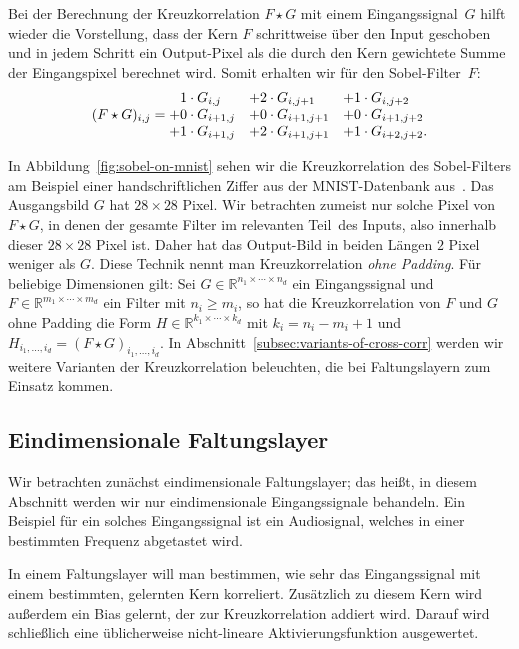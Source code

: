 \documentclass[paper=a4, 	%
		fontsize=11pt,
		abstract=true, 	%
		headsepline, 	%
		notitlepage	%
		]{scrartcl}
\theoremstyle{definition}
\newcommand{\R}{\mathbb{R}}
\begin{document}
Bei der Berechnung der Kreuzkorrelation $F\star G$ mit einem Eingangssignal~$G$ hilft wieder die Vorstellung, dass der Kern $F$ schrittweise über den Input geschoben und in jedem Schritt ein Output-Pixel als die durch den Kern gewichtete Summe der Eingangspixel berechnet wird.
Somit erhalten wir für den Sobel-Filter~$F$:
\[
(F\star G)_{i,j} = \begin{matrix*}[l]
    \hphantom{+}1\cdot G_{i,j}  & + 2\cdot G_{i, j+1} & + 1\cdot G_{i, j+2} \\
    + 0\cdot G_{i+1, j} &+ 0\cdot G_{i+1, j+1} &+ 0\cdot G_{i+1, j+2} \\
    +1\cdot G_{i+1, j} &+ 2\cdot G_{i+1, j+1} &+ 1\cdot G_{i+2, j+2}.
    \end{matrix*}
\]

In Abbildung~\ref{fig:sobel-on-mnist} sehen wir die Kreuzkorrelation des Sobel-Filters am Beispiel einer handschriftlichen Ziffer aus der MNIST-Datenbank aus~\cite{lecun2010mnist}.
Das Ausgangsbild $G$ hat $28\times 28$ Pixel.
Wir betrachten zumeist nur solche Pixel von $F\star G$, in denen der gesamte Filter im \glqq relevanten Teil\grqq\ des Inputs, also innerhalb dieser $28\times 28$ Pixel ist.
Daher hat das Output-Bild in beiden Längen $2$ Pixel weniger als $G$.
Diese Technik nennt man Kreuzkorrelation \emph{ohne Padding}.
Für beliebige Dimensionen gilt: Sei $G\in\R^{n_1\times\cdots \times n_d}$ ein Eingangssignal und $F\in\R^{m_1\times\cdots\times m_d}$ ein Filter mit $n_i \geq m_i$, so hat die Kreuzkorrelation von $F$ und $G$ ohne Padding die Form $H\in\R^{k_1\times\cdots\times k_d}$ mit $k_i = n_i - m_i + 1$ und $H_{i_1,\dots,i_d} = (F\star G)_{i_1,\dots,i_d}$. 
In Abschnitt~\ref{subsec:variants-of-cross-corr} werden wir weitere Varianten der Kreuzkorrelation beleuchten, die bei Faltungslayern zum Einsatz kommen.




\subsection{Eindimensionale Faltungslayer}

Wir betrachten zunächst eindimensionale Faltungslayer; das heißt, in diesem Abschnitt werden wir nur eindimensionale Eingangssignale behandeln.
Ein Beispiel für ein solches Eingangssignal ist ein Audiosignal, welches in einer bestimmten Frequenz abgetastet wird.

In einem Faltungslayer will man bestimmen, wie sehr das Eingangssignal mit einem bestimmten, gelernten Kern korreliert.
Zusätzlich zu diesem Kern wird außerdem ein Bias gelernt, der zur Kreuzkorrelation addiert wird.
Darauf wird schließlich eine üblicherweise nicht-lineare Aktivierungsfunktion ausgewertet.
\end{document}
